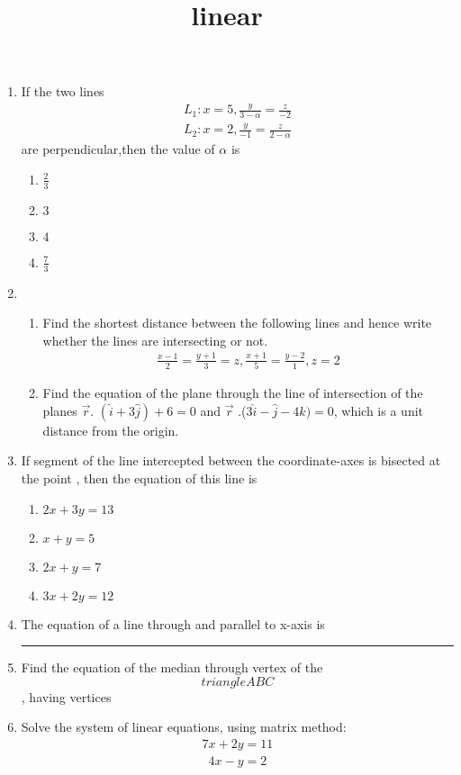 \documentclass{article}
\title{linear}
\begin{document}
\begin{enumerate}
	\item If the two lines
	\begin{align}	
		L_{1} : x=5, \frac{y}{3-\alpha} = \frac{z}{-2}
	\end{align}
	\begin{align}
		L_{2}: x=2, \frac{y}{-1} = \frac{z}{2-\alpha}
	\end{align}
   	 are perpendicular,then the value of $\alpha$ is
   	\begin{enumerate}%
   		\item $\frac{2}{3}$
		\item $3$
		\item $4$
		\item $\frac{7}{3}$
	\end{enumerate}
	\item \begin{enumerate} %
	\item Find the shortest distance between the following lines and hence write whether the lines are intersecting or not.
	\begin{align}
		\frac{x-1}{2} = \frac{y+1}{3}=z,
		\frac{x+1}{5} = \frac{y-2}{1}, 
		z=2
	\end{align}
	\item Find the equation of the plane through the line of intersection of the planes $\vec{r}$. $(\hat{i}+3\hat{j}) + 6 = 0$ and $\vec{r}$ .($3\hat{i}-\hat{j}-4\hat{k}) = 0$, which is a unit distance from the origin.
	\end{enumerate}
\item If segment of the line intercepted between the coordinate-axes is bisected at the point , then the equation of this line is
		\begin{enumerate}%
			\item $2x + 3y = 13$
			\item $x+y = 5$
			\item $2x + y = 7$
			\item $3x + 2y = 12$
		\end{enumerate}
	\item The equation of a line through  and parallel to x-axis is\rule{1cm}{0.15mm}
	\item Find the equation of the median through vertex  of the $$triangle ABC$$, having vertices 
	\item Solve the system of linear equations, using matrix method:
		\begin{align}	
			7x+2y = 11
		\end{align}
		\begin{align}
			4x-y = 2
		\end{align}
\end{enumerate}
\end{document}
